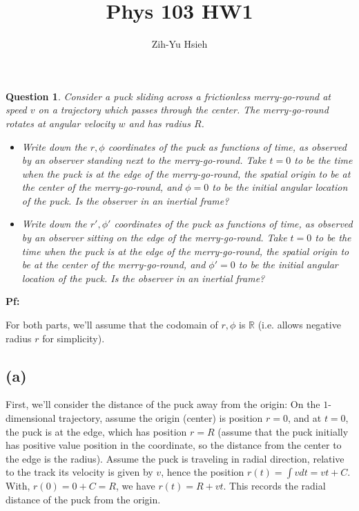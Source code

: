 \documentclass{article}
\title{Phys 103 HW1}
\author{Zih-Yu Hsieh}
\newtheorem{question}{Question}
\newcommand{\RR}{\mathbb{R}}
\begin{document}
\maketitle

\section{}%
\begin{question}\label{q1}
    Consider a puck sliding across a frictionless merry-go-round at speed $v$ on a trajectory which passes through the center. The merry-go-round rotates at angular velocity $w$ and has radius $R$.
    \begin{itemize}
        \item[(a)] Write down the $r,\phi$ coordinates of the puck as functions of time, as observed by an observer standing next to the merry-go-round. Take $t=0$ to be the time when the puck is at the edge of the merry-go-round, the spatial origin to be at the center of the merry-go-round, and $\phi=0$ to be the initial angular location of the puck. Is the observer in an inertial frame?
        \item[(b)] Write down the $r', \phi'$ coordinates of the puck as functions of time, as observed by an observer sitting on the edge of the merry-go-round. Take $t=0$ to be the time when the puck is at the edge of the merry-go-round, the spatial origin to be at the center of the merry-go-round, and $\phi'=0$ to be the initial angular location of the puck. Is the observer in an inertial frame?
    \end{itemize}
\end{question}

\textbf{Pf:}

For both parts, we'll assume that the codomain of $r,\phi$ is $\RR$ (i.e. allows negative radius $r$ for simplicity).
\subsection*{(a)}
First, we'll consider the distance of the puck away from the origin: On the $1$-dimensional trajectory, assume the origin (center) is position $r=0$, and at $t=0$, the puck is at the edge, which has position $r=R$ (assume that the puck initially has positive value position in the coordinate, so the distance from the center to the edge is the radius). Assume the puck is traveling in radial direction, relative to
 the track its velocity is given by $v$, hence the position $r(t) = \int vdt = vt+C$. With, $r(0) = 0+C = R$, we have $r(t)=R+vt$. This records the radial distance of the puck from the origin.
\end{document}
